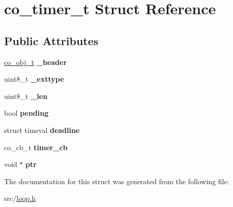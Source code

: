 \hypertarget{structco__timer__t}{\section{co\+\_\+timer\+\_\+t Struct Reference}
\label{structco__timer__t}
}
\subsection*{Public Attributes}
\begin{DoxyCompactItemize}
\item 
\hypertarget{structco__timer__t_a9b3934ba6edc38723af67f0fc92e9a2c}{\hyperlink{structco__obj__t}{co\+\_\+obj\+\_\+t} {\bfseries \+\_\+header}}\label{structco__timer__t_a9b3934ba6edc38723af67f0fc92e9a2c}

\item 
\hypertarget{structco__timer__t_a8d79bc02e9dcf8d7ef63ca06fd5fd6c6}{uint8\+\_\+t {\bfseries \+\_\+exttype}}\label{structco__timer__t_a8d79bc02e9dcf8d7ef63ca06fd5fd6c6}

\item 
\hypertarget{structco__timer__t_a854a227a7bc03660c299d8220af85c44}{uint8\+\_\+t {\bfseries \+\_\+len}}\label{structco__timer__t_a854a227a7bc03660c299d8220af85c44}

\item 
\hypertarget{structco__timer__t_ac476be185219f9890183741d912e8c4c}{bool {\bfseries pending}}\label{structco__timer__t_ac476be185219f9890183741d912e8c4c}

\item 
\hypertarget{structco__timer__t_ad058d8b24527bfb3de079906b344ff43}{struct timeval {\bfseries deadline}}\label{structco__timer__t_ad058d8b24527bfb3de079906b344ff43}

\item 
\hypertarget{structco__timer__t_a1d01faa89e52531b3d36d92dbd872847}{co\+\_\+cb\+\_\+t {\bfseries timer\+\_\+cb}}\label{structco__timer__t_a1d01faa89e52531b3d36d92dbd872847}

\item 
\hypertarget{structco__timer__t_af90e50601e8555239865b3294033b202}{void $\ast$ {\bfseries ptr}}\label{structco__timer__t_af90e50601e8555239865b3294033b202}

\end{DoxyCompactItemize}


The documentation for this struct was generated from the following file\+:\begin{DoxyCompactItemize}
\item 
src/\hyperlink{loop_8h}{loop.\+h}\end{DoxyCompactItemize}
